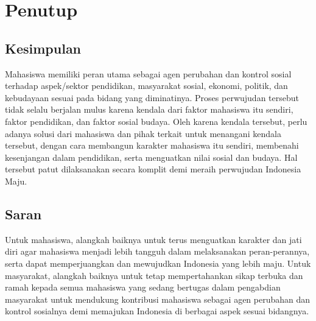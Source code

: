 \chapter{Penutup}


\section{Kesimpulan}

Mahasiswa memiliki peran utama sebagai agen perubahan dan kontrol sosial terhadap aspek/sektor pendidikan, masyarakat sosial, ekonomi, politik, dan kebudayaan sesuai pada bidang yang diminatinya. Proses perwujudan tersebut tidak selalu berjalan mulus karena kendala dari faktor mahasiswa itu sendiri, faktor pendidikan, dan faktor sosial budaya. Oleh karena kendala tersebut, perlu adanya solusi dari mahasiswa dan pihak terkait untuk menangani kendala tersebut, dengan cara membangun karakter mahasiswa itu sendiri, membenahi kesenjangan dalam pendidikan, serta menguatkan nilai sosial dan budaya. Hal tersebut patut dilaksanakan secara komplit demi meraih perwujudan Indonesia Maju.

\section{Saran}

Untuk mahasiswa, alangkah baiknya untuk terus menguatkan karakter dan jati diri agar mahasiswa menjadi lebih tangguh dalam melaksanakan peran-perannya, serta dapat memperjuangkan dan mewujudkan Indonesia yang lebih maju. Untuk masyarakat, alangkah baiknya untuk tetap mempertahankan sikap terbuka dan ramah kepada semua mahasiswa yang sedang bertugas dalam pengabdian masyarakat untuk mendukung kontribusi mahasiswa sebagai agen perubahan dan kontrol sosialnya demi memajukan Indonesia di berbagai aspek sesuai bidangnya.